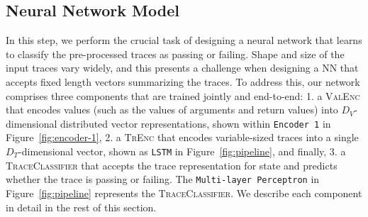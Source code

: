 

\subsection{Neural Network Model}
\label{sec:NN-model}
\newcommand{\valEncoder}{\textsc{ValEnc}\xspace}
\newcommand{\traceEncoder}{\textsc{TrEnc}\xspace}
\newcommand{\traceClassifier}{\textsc{TraceClassifier}\xspace}
In this step, we perform the crucial task of designing a neural network that learns to classify the pre-processed traces as passing or failing.
Shape and size of the input traces vary widely, and this presents a challenge when designing a NN that accepts fixed length vectors summarizing the traces.
To address this, our network comprises three components that are trained jointly and end-to-end: 1. a \valEncoder that encodes values (such as the values of arguments and return values) into $D_V$-dimensional distributed vector representations, shown within \texttt{Encoder 1} in Figure~\ref{fig:encoder-1}, 2. a \traceEncoder that encodes variable-sized traces into a single $D_T$-dimensional vector, shown as \texttt{LSTM} in Figure~\ref{fig:pipeline}, and finally, 3. a \traceClassifier that accepts the trace representation for state and predicts whether the trace is passing or failing. The \texttt{Multi-layer Perceptron} in Figure~\ref{fig:pipeline} represents the \traceClassifier.  We describe each component in detail in the rest of this section.


